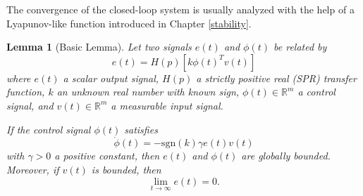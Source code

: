 \documentclass[
]{book}
\newtheorem{lemma}{Lemma}[chapter]
\theoremstyle{definition}
\theoremstyle{definition}
\theoremstyle{definition}
\theoremstyle{definition}
\theoremstyle{remark}
\begin{document}
The convergence of the closed-loop system is usually analyzed with the help of a Lyapunov-like function introduced in Chapter \ref{stability}.

\begin{lemma}[Basic Lemma]
\protect\hypertarget{lem:adaptivecontrolbasic}{}\label{lem:adaptivecontrolbasic}Let two signals \(e(t)\) and \(\phi(t)\) be related by
\begin{equation}
e(t) = H(p)[k \phi(t)^T v(t)]
\label{eq:acbasiclemmaephi}
\end{equation}
where \(e(t)\) a scalar output signal, \(H(p)\) a strictly positive real (SPR) transfer function, \(k\) an unknown real number with known sign, \(\phi(t) \in \mathbb{R}^m\) a control signal, and \(v(t) \in \mathbb{R}^m\) a measurable input signal.

If the control signal \(\phi(t)\) satisfies
\begin{equation}
\dot{\phi}(t) = - \mathrm{sgn}(k) \gamma e(t) v(t)
\label{eq:acbasiclemmaphilaw}
\end{equation}
with \(\gamma > 0\) a positive constant, then \(e(t)\) and \(\phi(t)\) are globally bounded. Moreover, if \(v(t)\) is bounded, then
\[
\lim_{t \rightarrow \infty} e(t) = 0.
\]
\end{lemma}
\end{document}
